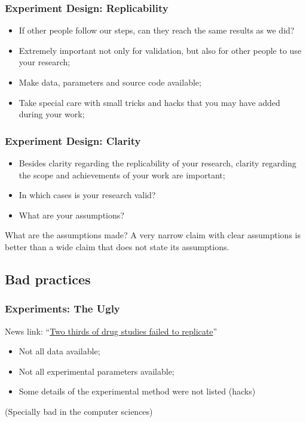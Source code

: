 \documentclass{beamer}
\begin{document}
\begin{frame}
  \frametitle{Experiment Design: Replicability} %
  \begin{itemize}
  \item If other people follow our steps, can they reach the same
    results as we did?
  \item Extremely important not only for validation, but also for
    other people to use your research;
  \item Make data, parameters and source code available;
  \item Take special care with small tricks and hacks that you may
    have added during your work;
  \end{itemize}
\end{frame}

\begin{frame}
  \frametitle{Experiment Design: Clarity} %
  \begin{itemize}
  \item Besides clarity regarding the replicability of your research,
    clarity regarding the scope and achievements of your work are
    important;
  \item In which cases is your research valid?
  \item What are your assumptions?
  \end{itemize}
  \bigskip

  \begin{block}{What are the assumptions made?}
    A very narrow claim with clear assumptions is better than a wide
    claim that does not state its assumptions.
  \end{block}
\end{frame}

\subsection{Bad practices}
\begin{frame}
  \frametitle{Experiments: The Ugly}
  \begin{block}{}
    News link:
    ``\href{http://www.newscientist.com/article/mg21528826.000-is-medical-science-built-on-shaky-foundations.html}{Two
      thirds of drug studies failed to replicate}''
  \end{block}
  \bigskip
  
  \begin{itemize}
  \item Not all data available;
  \item Not all experimental parameters available;
  \item Some details of the experimental method were not listed
    (hacks)
  \end{itemize}
  \vfill
  \begin{center}
    (Specially bad in the computer sciences)
  \end{center}
  
\end{frame}
\end{document}

